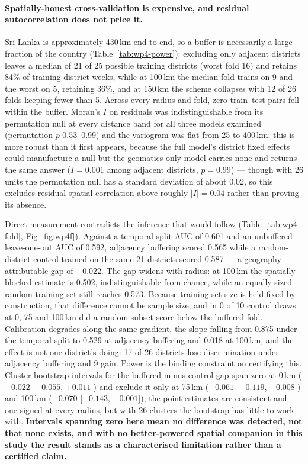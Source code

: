\documentclass[11pt,a4paper]{article}
\begin{document}
\paragraph{Spatially-honest cross-validation is expensive, and residual autocorrelation does not price it.} Sri Lanka is approximately 430\,km end to end, so a buffer is necessarily a large fraction of the country (Table~\ref{tab:wp4-power}): excluding only adjacent districts leaves a median of 21 of 25 possible training districts (worst fold 16) and retains 84\% of training district-weeks, while at 100\,km the median fold trains on 9 and the worst on 5, retaining 36\%, and at 150\,km the scheme collapses with 12 of 26 folds keeping fewer than 5. Across every radius and fold, zero train--test pairs fell within the buffer. Moran's $I$ on residuals was indistinguishable from its permutation null at every distance band for all three models examined (permutation $p$ 0.53--0.99) and the variogram was flat from 25 to 400\,km; this is more robust than it first appears, because the full model's district fixed effects could manufacture a null but the geomatics-only model carries none and returns the same answer ($I=0.001$ among adjacent districts, $p=0.99$) --- though with 26 units the permutation null has a standard deviation of about 0.02, so this excludes residual spatial correlation above roughly $|I|=0.04$ rather than proving its absence.

Direct measurement contradicts the inference that would follow (Table~\ref{tab:wp4-fold}, Fig~\ref{fig:wp4f}). Against a temporal-split AUC of 0.601 and an unbuffered leave-one-out AUC of 0.592, adjacency buffering scored 0.565 while a random-district control trained on the same 21 districts scored 0.587 --- a geography-attributable gap of $-0.022$. The gap widens with radius: at 100\,km the spatially blocked estimate is 0.502, indistinguishable from chance, while an equally sized random training set still reaches 0.573. Because training-set size is held fixed by construction, that difference cannot be sample size, and in 0 of 10 control draws at 0, 75 and 100\,km did a random subset score below the buffered fold. Calibration degrades along the same gradient, the slope falling from 0.875 under the temporal split to 0.529 at adjacency buffering and 0.018 at 100\,km, and the effect is not one district's doing: 17 of 26 districts lose discrimination under adjacency buffering and 9 gain. Power is the binding constraint on certifying this. Cluster-bootstrap intervals for the buffered-minus-control gap span zero at 0\,km ($-0.022$ [$-0.055$, $+0.011$]) and exclude it only at 75\,km ($-0.061$ [$-0.119$, $-0.008$]) and 100\,km ($-0.070$ [$-0.143$, $-0.001$]); the point estimates are consistent and one-signed at every radius, but with 26 clusters the bootstrap has little to work with. \textbf{Intervals spanning zero here mean no difference was detected, not that none exists, and with no better-powered spatial companion in this study the result stands as a characterised limitation rather than a certified claim.}
\end{document}
